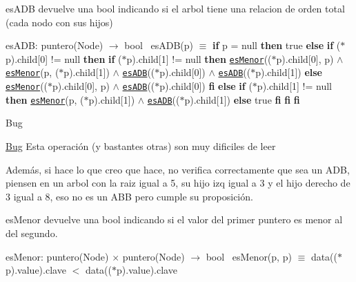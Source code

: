 \begin{DoxyParagraph}{es\+A\+DB}
devuelve una bool indicando si el arbol tiene una relacion de orden total (cada nodo con sus hijos)

es\+A\+DB\+: puntero(\+Node) $\to$ bool~\newline
 es\+A\+D\+B(p) $\equiv$ {\bfseries if} p = null {\bfseries then} true {\bfseries else} {\bfseries if} ($\ast$p).child\mbox{[}0\mbox{]} != null {\bfseries then} {\bfseries if} ($\ast$p).child\mbox{[}1\mbox{]} != null {\bfseries then} \href{axiomas.html#esMenor}{\tt es\+Menor}(($\ast$p).child\mbox{[}0\mbox{]}, p) $\land$ \href{axiomas.html#esMenor}{\tt es\+Menor}(p, ($\ast$p).child\mbox{[}1\mbox{]}) $\land$ \href{axiomas.html#esADB}{\tt es\+A\+DB}(($\ast$p).child\mbox{[}0\mbox{]}) $\land$ \href{axiomas.html#esADB}{\tt es\+A\+DB}(($\ast$p).child\mbox{[}1\mbox{]}) {\bfseries else} \href{axiomas.html#esMenor}{\tt es\+Menor}(($\ast$p).child\mbox{[}0\mbox{]}, p) $\land$ \href{axiomas.html#esADB}{\tt es\+A\+DB}(($\ast$p).child\mbox{[}0\mbox{]}) {\bfseries fi} {\bfseries else} {\bfseries if} ($\ast$p).child\mbox{[}1\mbox{]} != null {\bfseries then} \href{axiomas.html#esMenor}{\tt es\+Menor}(p, ($\ast$p).child\mbox{[}1\mbox{]}) $\land$ \href{axiomas.html#esADB}{\tt es\+A\+DB}(($\ast$p).child\mbox{[}1\mbox{]}) {\bfseries else} true {\bfseries fi} {\bfseries fi} {\bfseries fi} 
\end{DoxyParagraph}


\begin{DoxyRefDesc}{Bug}
\item[\hyperlink{bug__bug000001}{Bug}]Esta operación (y bastantes otras) son muy dificiles de leer 

Además, si hace lo que creo que hace, no verifica correctamente que sea un A\+DB, piensen en un arbol con la raiz igual a 5, su hijo izq igual a 3 y el hijo derecho de 3 igual a 8, eso no es un A\+BB pero cumple su proposición.\end{DoxyRefDesc}


\begin{DoxyParagraph}{es\+Menor}
devuelve una bool indicando si el valor del primer puntero es menor al del segundo.

es\+Menor\+: puntero(\+Node) $\times$ puntero(\+Node) $\to$ bool~\newline
 es\+Menor(p, p\textquotesingle{}) $\equiv$ data(($\ast$p).value).clave $<$ data(($\ast$p).value).clave 
\end{DoxyParagraph}


